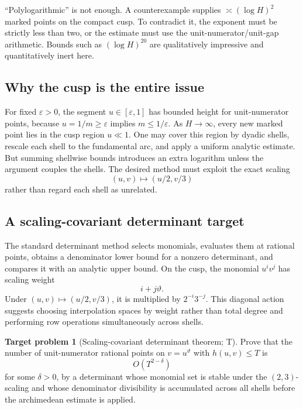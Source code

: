 \documentclass[10pt,oneside]{article}
\theoremstyle{definition}
\newtheorem{problem}[theorem]{Target problem}
\theoremstyle{remark}
\newcommand{\thetaq}{\vartheta}
\newcommand{\statusT}{\textsc{T}}
\begin{document}
\begin{cautionbox}
``Polylogarithmic'' is not enough.  A counterexample supplies \(\asymp(\log H)^2\) marked points on the compact cusp.  To contradict it, the exponent must be strictly less than two, or the estimate must use the unit-numerator/unit-gap arithmetic.  Bounds such as \((\log H)^{20}\) are qualitatively impressive and quantitatively inert here.
\end{cautionbox}

\subsection{Why the cusp is the entire issue}
For fixed \(\varepsilon>0\), the segment \(u\in[\varepsilon,1]\) has bounded height for unit-numerator points, because \(u=1/m\ge\varepsilon\) implies \(m\le1/\varepsilon\).  As \(H\to\infty\), every new marked point lies in the cusp region \(u\ll1\).  One may cover this region by dyadic shells, rescale each shell to the fundamental arc, and apply a uniform analytic estimate.  But summing shellwise bounds introduces an extra logarithm unless the argument couples the shells.  The desired method must exploit the exact scaling
\[
 (u,v)\mapsto(u/2,v/3)
\]
rather than regard each shell as unrelated.

\subsection{A scaling-covariant determinant target}
The standard determinant method selects monomials, evaluates them at rational points, obtains a denominator lower bound for a nonzero determinant, and compares it with an analytic upper bound.  On the cusp, the monomial \(u^iv^j\) has scaling weight
\[
 i+j\thetaq.
\]
Under \((u,v)\mapsto(u/2,v/3)\), it is multiplied by \(2^{-i}3^{-j}\).  This diagonal action suggests choosing interpolation spaces by weight rather than total degree and performing row operations simultaneously across shells.

\begin{problem}[Scaling-covariant determinant theorem; \statusT]
\label{prob:scaling-determinant}
Prove that the number of unit-numerator rational points on
\(v=u^{\thetaq}\) with \(h(u,v)\le T\) is
\[
 O(T^{2-\delta})
\]
for some \(\delta>0\), by a determinant whose monomial set is stable under the \((2,3)\)-scaling and whose denominator divisibility is accumulated across all shells before the archimedean estimate is applied.
\end{problem}
\end{document}
